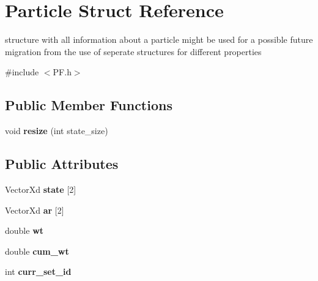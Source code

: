 \hypertarget{structParticle}{\section{Particle Struct Reference}
\label{structParticle}
}


structure with all information about a particle might be used for a possible future migration from the use of seperate structures for different properties  




{\ttfamily \#include $<$P\-F.\-h$>$}

\subsection*{Public Member Functions}
\begin{DoxyCompactItemize}
\item 
\hypertarget{structParticle_a9fff6d58126c0a375928dcd13829b3c1}{void {\bfseries resize} (int state\-\_\-size)}\label{structParticle_a9fff6d58126c0a375928dcd13829b3c1}

\end{DoxyCompactItemize}
\subsection*{Public Attributes}
\begin{DoxyCompactItemize}
\item 
\hypertarget{structParticle_a591845d3766063e8e71d3ccbb175cf71}{Vector\-Xd {\bfseries state} \mbox{[}2\mbox{]}}\label{structParticle_a591845d3766063e8e71d3ccbb175cf71}

\item 
\hypertarget{structParticle_a089262c341f012b372a4534bf75bb6ce}{Vector\-Xd {\bfseries ar} \mbox{[}2\mbox{]}}\label{structParticle_a089262c341f012b372a4534bf75bb6ce}

\item 
\hypertarget{structParticle_a9326cafcd09d7399baa353aed8115604}{double {\bfseries wt}}\label{structParticle_a9326cafcd09d7399baa353aed8115604}

\item 
\hypertarget{structParticle_af70ebdb331cd84e591fec11e973ef1e0}{double {\bfseries cum\-\_\-wt}}\label{structParticle_af70ebdb331cd84e591fec11e973ef1e0}

\item 
\hypertarget{structParticle_a4a69275c4ffd5f54f6dab2dfec6248e4}{int {\bfseries curr\-\_\-set\-\_\-id}}\label{structParticle_a4a69275c4ffd5f54f6dab2dfec6248e4}

\end{DoxyCompactItemize}


